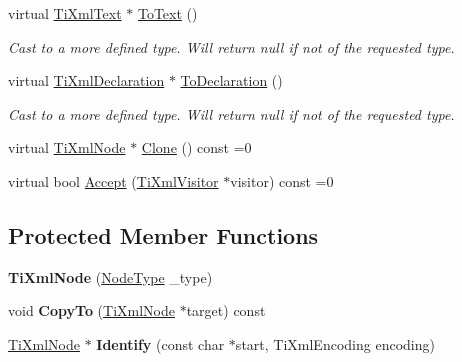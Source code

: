 \begin{DoxyCompactItemize}
\mbox{\label{classTiXmlNode_a3ddfbcac78fbea041fad57e5c6d60a03}} 
virtual \hyperlink{classTiXmlText}{Ti\+Xml\+Text} $\ast$ \hyperlink{classTiXmlNode_a3ddfbcac78fbea041fad57e5c6d60a03}{To\+Text} ()
\begin{DoxyCompactList}\small\item\em Cast to a more defined type. Will return null if not of the requested type. \end{DoxyCompactList}\item 
\mbox{\label{classTiXmlNode_a4027136ca820ff4a636b607231b6a6df}} 
virtual \hyperlink{classTiXmlDeclaration}{Ti\+Xml\+Declaration} $\ast$ \hyperlink{classTiXmlNode_a4027136ca820ff4a636b607231b6a6df}{To\+Declaration} ()
\begin{DoxyCompactList}\small\item\em Cast to a more defined type. Will return null if not of the requested type. \end{DoxyCompactList}\item 
virtual \hyperlink{classTiXmlNode}{Ti\+Xml\+Node} $\ast$ \hyperlink{classTiXmlNode_a4508cc3a2d7a98e96a54cc09c37a78a4}{Clone} () const =0
\item 
virtual bool \hyperlink{classTiXmlNode_acc0f88b7462c6cb73809d410a4f5bb86}{Accept} (\hyperlink{classTiXmlVisitor}{Ti\+Xml\+Visitor} $\ast$visitor) const =0
\end{DoxyCompactItemize}
\subsection*{Protected Member Functions}
\begin{DoxyCompactItemize}
\item 
\mbox{\label{classTiXmlNode_a3f46721695868667113c7487ff123f20}} 
{\bfseries Ti\+Xml\+Node} (\hyperlink{classTiXmlNode_a836eded4920ab9e9ef28496f48cd95a2}{Node\+Type} \+\_\+type)
\item 
\mbox{\label{classTiXmlNode_aaadd5bb9c94f84c4472b649b95de4a0b}} 
void {\bfseries Copy\+To} (\hyperlink{classTiXmlNode}{Ti\+Xml\+Node} $\ast$target) const
\item 
\mbox{\label{classTiXmlNode_ac1e3a8e7578be463b04617786120c2bb}} 
\hyperlink{classTiXmlNode}{Ti\+Xml\+Node} $\ast$ {\bfseries Identify} (const char $\ast$start, Ti\+Xml\+Encoding encoding)
\end{DoxyCompactItemize}
